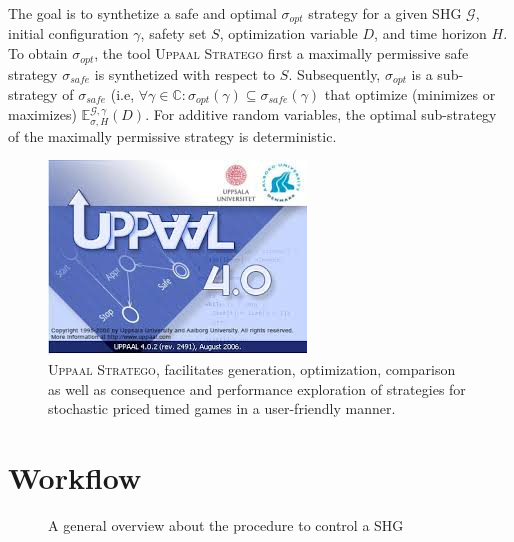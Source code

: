     The goal is to synthetize a safe and optimal $\sigma_{opt}$ 
    strategy for a given \ac{SHG} $\mathcal{G}$, initial configuration
    $\gamma$, safety set $S$, optimization variable $D$, and time 
    horizon $H$. To obtain 
    $\sigma_{opt}$, the tool \textsc{Uppaal Stratego} first a 
    maximally permissive safe strategy $\sigma_{safe}$ is synthetized
    with respect to $S$. Subsequently, $\sigma_{opt}$ is a sub-strategy
    of $\sigma_{safe}$ (i.e, $\forall \gamma \in \mathbb{C}: 
    \sigma_{opt}(\gamma) \subseteq \sigma_{safe}(\gamma)$ that 
    optimize (minimizes or maximizes) $\mathbb{E}^{\mathcal{G},
    \gamma}_{\sigma,H}(D)$. For additive random variables, the 
    optimal sub-strategy of the maximally permissive strategy is 
    deterministic.

    \begin{figure}[!hbt]
      \centering
      \includegraphics[width=0.4\linewidth]{images/uppaalstratego.jpeg}
      \captionsetup{format=hang}
      \caption{ \textsc{Uppaal Stratego}, facilitates generation, optimization, comparison as well as consequence and performance exploration of strategies for stochastic priced timed games in a user-friendly manner.}
      \label{fig:uppaalstratego}
    \end{figure}

    \clearpage
    
\section{Workflow}
    \label{sec:workflow}
    \begin{figure}[!hbt]
      \centering
      
      \captionsetup{format=hang}
      \caption{A general overview about the procedure to control a \ac{SHG}}
      \label{fig:perturbationsgeneration}
    \end{figure}
